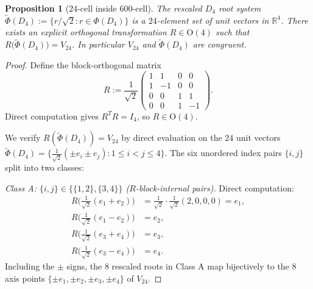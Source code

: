 \documentclass[11pt, a4paper]{amsart}
\newtheorem{proposition}[theorem]{Proposition}
\theoremstyle{definition}
\newcommand{\R}{\mathbb{R}}
\begin{document}
\begin{proposition}[$24$-cell inside $600$-cell]
\label{prop:24-in-600}
The rescaled $D_4$ root system $\tilde\Phi(D_4) := \{r/\sqrt 2 :
r \in \Phi(D_4)\}$ is a $24$-element set of unit vectors in $\R^4$.
There exists an explicit orthogonal transformation $R \in
\mathrm{O}(4)$ such that $R\big(\tilde\Phi(D_4)\big) = V_{24}$. In
particular $V_{24}$ and $\tilde\Phi(D_4)$ are congruent.
\end{proposition}

\begin{proof}
Define the block-orthogonal matrix
\[
  R := \frac{1}{\sqrt 2}
  \begin{pmatrix}
    1 & 1 & 0 & 0 \\
    1 & -1 & 0 & 0 \\
    0 & 0 & 1 & 1 \\
    0 & 0 & 1 & -1
  \end{pmatrix}.
\]
Direct computation gives $R^T R = I_4$, so $R \in \mathrm{O}(4)$.

We verify $R(\tilde\Phi(D_4)) = V_{24}$ by direct evaluation on the
$24$ unit vectors
$\tilde\Phi(D_4) = \big\{\tfrac{1}{\sqrt 2}(\pm e_i \pm e_j) :
1 \leq i < j \leq 4 \big\}$. The six unordered index pairs
$\{i, j\}$ split into two classes:

\emph{Class A: $\{i, j\} \in \{\{1, 2\}, \{3, 4\}\}$
($R$-block-internal pairs).} Direct computation:
\begin{align*}
  R\big(\tfrac{1}{\sqrt 2}(e_1 + e_2)\big) &=
    \tfrac{1}{\sqrt 2} \cdot \tfrac{1}{\sqrt 2}(2, 0, 0, 0) =
    e_1, \\
  R\big(\tfrac{1}{\sqrt 2}(e_1 - e_2)\big) &= e_2, \\
  R\big(\tfrac{1}{\sqrt 2}(e_3 + e_4)\big) &= e_3, \\
  R\big(\tfrac{1}{\sqrt 2}(e_3 - e_4)\big) &= e_4.
\end{align*}
Including the $\pm$ signs, the $8$ rescaled roots in Class A map
bijectively to the $8$ axis points $\{\pm e_1, \pm e_2, \pm e_3,
\pm e_4\}$ of $V_{24}$.


\end{proof}
\end{document}
